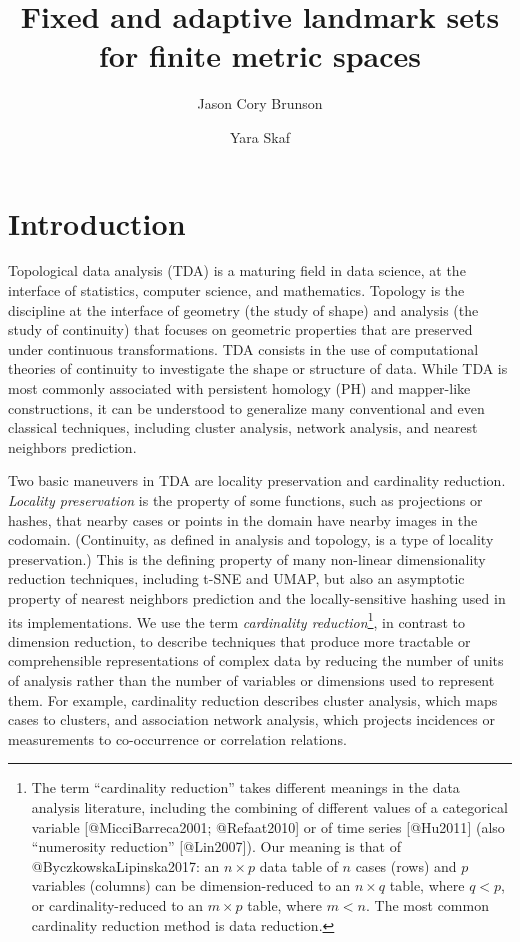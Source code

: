 \documentclass[
]{article}
\title{Fixed and adaptive landmark sets for finite metric spaces}
\author{Jason Cory Brunson \and Yara Skaf}
\date{}
\begin{document}
\maketitle

\pagebreak

\hypertarget{introduction}{%
\section{Introduction}\label{introduction}}

Topological data analysis (TDA) is a maturing field in data science, at
the interface of statistics, computer science, and mathematics. Topology
is the discipline at the interface of geometry (the study of shape) and
analysis (the study of continuity) that focuses on geometric properties
that are preserved under continuous transformations. TDA consists in the
use of computational theories of continuity to investigate the shape or
structure of data. While TDA is most commonly associated with persistent
homology (PH) and mapper-like constructions, it can be understood to
generalize many conventional and even classical techniques, including
cluster analysis, network analysis, and nearest neighbors prediction.

Two basic maneuvers in TDA are locality preservation and cardinality
reduction. \emph{Locality preservation} is the property of some
functions, such as projections or hashes, that nearby cases or points in
the domain have nearby images in the codomain. (Continuity, as defined
in analysis and topology, is a type of locality preservation.) This is
the defining property of many non-linear dimensionality reduction
techniques, including t-SNE and UMAP, but also an asymptotic property of
nearest neighbors prediction and the locally-sensitive hashing used in
its implementations. We use the term \emph{cardinality
reduction}\footnote{The term ``cardinality reduction'' takes different
  meanings in the data analysis literature, including the combining of
  different values of a categorical variable {[}@MicciBarreca2001;
  @Refaat2010{]} or of time series {[}@Hu2011{]} (also ``numerosity
  reduction'' {[}@Lin2007{]}). Our meaning is that of
  @ByczkowskaLipinska2017: an \(n\times p\) data table of \(n\) cases
  (rows) and \(p\) variables (columns) can be dimension-reduced to an
  \(n\times q\) table, where \(q<p\), or cardinality-reduced to an
  \(m\times p\) table, where \(m<n\). The most common cardinality
  reduction method is data reduction.}, in contrast to dimension
reduction, to describe techniques that produce more tractable or
comprehensible representations of complex data by reducing the number of
units of analysis rather than the number of variables or dimensions used
to represent them. For example, cardinality reduction describes cluster
analysis, which maps cases to clusters, and association network
analysis, which projects incidences or measurements to co-occurrence or
correlation relations.
\end{document}
